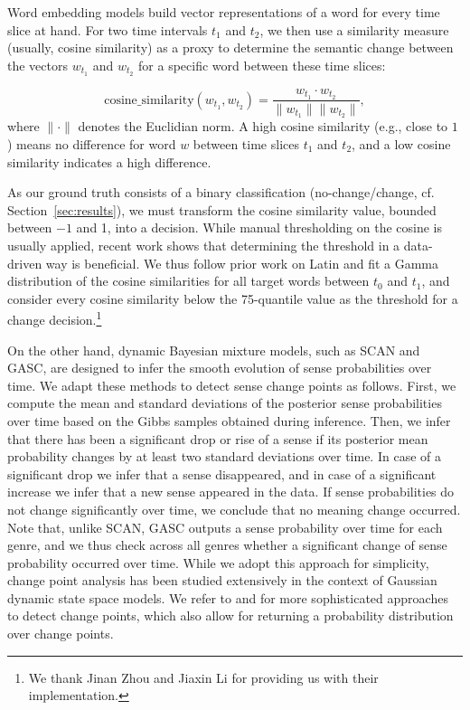 \documentclass[output=paper]{langscibook}
\begin{document}
Word embedding models build vector representations of a word for every time slice at hand. For two time intervals $t_1$ and $t_2$, we then use a similarity measure (usually, cosine similarity) as a proxy to determine the semantic change between the vectors $w_{t_1}$ and $w_{t_2}$ for a specific word between these time slices:

\[\text{cosine\_similarity}(w_{t_1}, w_{t_2}) =
\frac{w_{t_1} \cdot w_{t_2}}{\|  w_{t_1} \| \| w_{t_2} \|},\] 
where $\|  \cdot \|$ denotes the Euclidian norm. A high cosine similarity (e.g., close to $1$) means no difference for word $w$ between time slices $t_1$ and $t_2$, and a low cosine similarity indicates a high difference.

As our ground truth consists of a binary classification (no-change\slash change, cf. Section~\ref{sec:results}), we must transform the cosine similarity value, bounded between $-1$ and 1, into a decision. 
While manual thresholding on the cosine is usually applied, recent work \citep{zhou-etal-2020-temporalteller} shows that determining the threshold in a data-driven way is beneficial. We thus follow prior work on Latin and fit a Gamma distribution of the cosine similarities for all target words between $t_0$ and $t_1$, and consider every cosine similarity below the 75-quantile value as the threshold for a change decision.\footnote{We thank Jinan Zhou and Jiaxin Li for providing us with their implementation.}

On the other hand, dynamic Bayesian mixture models, such as SCAN and GASC, are designed to infer the smooth evolution of sense probabilities over time. We adapt these methods to detect sense change points as follows. First, we compute the mean and standard deviations of the posterior sense probabilities over time based on the Gibbs samples obtained during inference. Then, we infer that there has been a significant drop or rise of a sense if its posterior mean probability changes by at least two standard deviations over time. In case of a significant drop we infer that a sense disappeared, and in case of a significant increase we infer that a new sense appeared in the data. If sense probabilities do not change significantly over time, we conclude that no meaning change occurred. Note that, unlike SCAN, GASC outputs a sense probability over time for each genre, and we thus check across all genres whether a significant change of sense probability occurred over time. While we adopt this approach for simplicity, change point analysis has been studied extensively in the context of Gaussian dynamic state space models. We refer to \citet{west1997} and \citet{frue2006} for more sophisticated approaches to detect change points, which also allow for returning a probability distribution over change points.
\end{document}
